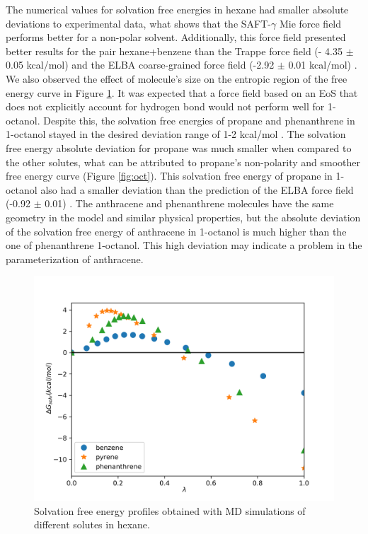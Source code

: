 The numerical values for solvation free energies in hexane had smaller absolute deviations to experimental data, what shows that the SAFT-$\gamma$ Mie force field performs better for a non-polar solvent. Additionally, this force field presented better results for the pair hexane+benzene than the Trappe force field (- 4.35  $\pm$ 0.05 kcal/mol) \cite{garrido2011} and the ELBA coarse-grained force field  (-2.92 $\pm$ 0.01 kcal/mol) \cite{doi:10.1021/acs.jctc.5b00963}. We also observed the effect of molecule's size on the entropic region of the free energy curve in Figure \ref{fig:hex}. It was expected that a force field based on an EoS that does not explicitly account for hydrogen bond would not perform well for 1-octanol. Despite this, the solvation free energies of propane and phenanthrene in 1-octanol stayed in the desired deviation range of 1-2 kcal/mol \cite{doimobley}. The solvation free energy absolute deviation for propane was much smaller when compared to the other solutes, what can be attributed to propane's non-polarity and smoother free energy curve (Figure \ref{fig:oct}). This solvation free energy of propane in 1-octanol also had a smaller deviation than the prediction of the ELBA force field (-0.92 $\pm$ 0.01) \cite{doi:10.1021/acs.jctc.5b00963}. The anthracene and phenanthrene molecules have the same geometry in the model and similar physical properties, but the absolute deviation of the solvation free energy of anthracene in 1-octanol is much higher than the one of phenanthrene 1-octanol. This high deviation may indicate a problem in the parameterization of anthracene.      

\begin{figure}[H]
\centering
\includegraphics[width=0.8\linewidth]{Figures/hex}
\caption{Solvation free energy profiles obtained with MD simulations of different solutes in hexane.}
\label{fig:hex}
\end{figure}

